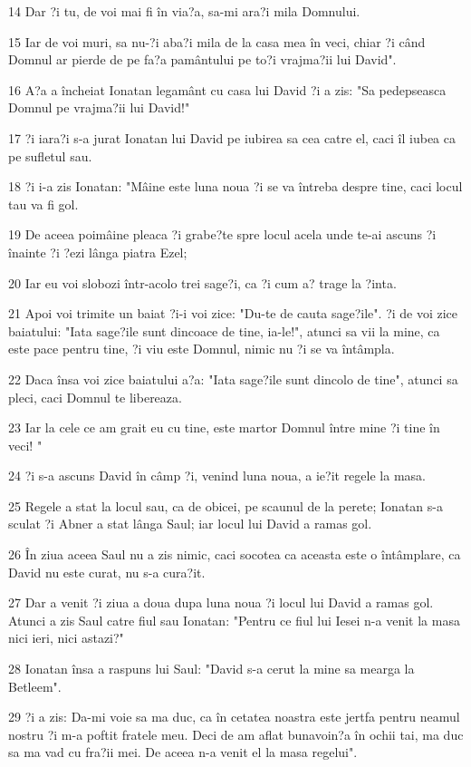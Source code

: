 \par 14 Dar ?i tu, de voi mai fi în via?a, sa-mi ara?i mila Domnului.
\par 15 Iar de voi muri, sa nu-?i aba?i mila de la casa mea în veci, chiar ?i când Domnul ar pierde de pe fa?a pamântului pe to?i vrajma?ii lui David".
\par 16 A?a a încheiat Ionatan legamânt cu casa lui David ?i a zis: "Sa pedepseasca Domnul pe vrajma?ii lui David!"
\par 17 ?i iara?i s-a jurat Ionatan lui David pe iubirea sa cea catre el, caci îl iubea ca pe sufletul sau.
\par 18 ?i i-a zis Ionatan: "Mâine este luna noua ?i se va întreba despre tine, caci locul tau va fi gol.
\par 19 De aceea poimâine pleaca ?i grabe?te spre locul acela unde te-ai ascuns ?i înainte ?i ?ezi lânga piatra Ezel;
\par 20 Iar eu voi slobozi într-acolo trei sage?i, ca ?i cum a? trage la ?inta.
\par 21 Apoi voi trimite un baiat ?i-i voi zice: "Du-te de cauta sage?ile". ?i de voi zice baiatului: "Iata sage?ile sunt dincoace de tine, ia-le!", atunci sa vii la mine, ca este pace pentru tine, ?i viu este Domnul, nimic nu ?i se va întâmpla.
\par 22 Daca însa voi zice baiatului a?a: "Iata sage?ile sunt dincolo de tine", atunci sa pleci, caci Domnul te libereaza.
\par 23 Iar la cele ce am grait eu cu tine, este martor Domnul între mine ?i tine în veci! "
\par 24 ?i s-a ascuns David în câmp ?i, venind luna noua, a ie?it regele la masa.
\par 25 Regele a stat la locul sau, ca de obicei, pe scaunul de la perete; Ionatan s-a sculat ?i Abner a stat lânga Saul; iar locul lui David a ramas gol.
\par 26 În ziua aceea Saul nu a zis nimic, caci socotea ca aceasta este o întâmplare, ca David nu este curat, nu s-a cura?it.
\par 27 Dar a venit ?i ziua a doua dupa luna noua ?i locul lui David a ramas gol. Atunci a zis Saul catre fiul sau Ionatan: "Pentru ce fiul lui Iesei n-a venit la masa nici ieri, nici astazi?"
\par 28 Ionatan însa a raspuns lui Saul: "David s-a cerut la mine sa mearga la Betleem".
\par 29 ?i a zis: Da-mi voie sa ma duc, ca în cetatea noastra este jertfa pentru neamul nostru ?i m-a poftit fratele meu. Deci de am aflat bunavoin?a în ochii tai, ma duc sa ma vad cu fra?ii mei. De aceea n-a venit el la masa regelui".

